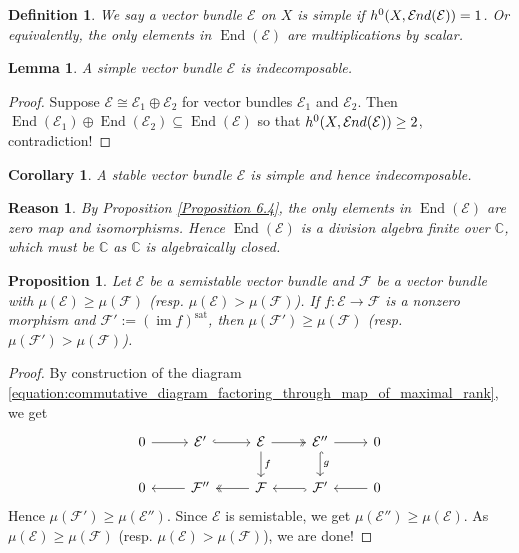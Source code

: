 \documentclass{ctexart}
\newtheorem{definition}{Definition}[section]
\newtheorem{proposition}{Proposition}[section]
\newtheorem{lemma}{Lemma}[section]
\newtheorem{reason}{Reason}[section]
\newtheorem{corollary}{Corollary}[section]
\newcommand{\im}{\operatorname{im}}
\newcommand{\homend}{\operatorname{End}}
\newcommand{\sheafend}{\mathcal{E}\kern -.5pt nd}
\newcommand{\saturation}{\operatorname{sat}}
\begin{document}
\begin{definition}
    We say a vector bundle $\mathcal{E}$ on $X$ is simple if $h^{0}(X, \sheafend(\mathcal{E})) = 1$.
    Or equivalently, the only elements in $\homend(\mathcal{E})$ are multiplications by scalar.
\end{definition}
\begin{lemma}
    A simple vector bundle $\mathcal{E}$ is indecomposable.
    \label{Lemma 6.4}
\end{lemma}
\begin{proof}
    Suppose $\mathcal{E} \cong \mathcal{E}_{1} \oplus \mathcal{E}_{2}$ for vector bundles $\mathcal{E}_{1}$ and $\mathcal{E}_{2}$.
    Then $\homend(\mathcal{E}_{1}) \oplus \homend(\mathcal{E}_{2}) \subseteq \homend(\mathcal{E})$ so that $h^{0}(X, \sheafend(\mathcal{E})) \ge 2$, contradiction!
\end{proof}
\begin{corollary}
    A stable vector bundle $\mathcal{E}$ is simple and hence indecomposable.
    \label{Corollary 6.1}
\end{corollary}
\begin{reason}
    By Proposition \ref{Proposition 6.4}, the only elements in $\homend(\mathcal{E})$ are zero map and isomorphisms.
    Hence $\homend(\mathcal{E})$ is a division algebra finite over $\mathbb{C}$, which must be $\mathbb{C}$ as $\mathbb{C}$ is algebraically closed.
\end{reason}
\begin{proposition}
    Let $\mathcal{E}$ be a semistable vector bundle and $\mathcal{F}$ be a vector bundle with $\mu(\mathcal{E}) \ge \mu(\mathcal{F})$ (resp. $\mu(\mathcal{E}) > \mu(\mathcal{F})$).
    If $f: \mathcal{E} \rightarrow \mathcal{F}$ is a nonzero morphism and $\mathcal{F}' := (\im f)^{\saturation}$, then $\mu(\mathcal{F}') \ge \mu(\mathcal{F})$ (resp. $\mu(\mathcal{F}') > \mu(\mathcal{F})$).
    \label{Proposition 6.5}
\end{proposition}
\begin{proof}
    By construction of the diagram \ref{equation:commutative_diagram_factoring_through_map_of_maximal_rank}, we get
    \begin{equation}
        \begin{tikzcd}
            0 \arrow[r] &
            \mathcal{E}' \arrow[r, hookrightarrow] &
            \mathcal{E} \arrow[r, twoheadrightarrow] \arrow[d, "f"] &
            \mathcal{E}'' \arrow[r] \arrow[d, hookrightarrow, "g"] &
            0 \\
            0 &
            \mathcal{F}'' \arrow[l] &
            \mathcal{F} \arrow[l, twoheadrightarrow] &
            \mathcal{F}' \arrow[l, hookrightarrow] &
            0 \arrow[l] 
        \end{tikzcd}
    \end{equation}
    Hence $\mu(\mathcal{F}') \ge \mu(\mathcal{E}'')$.
    Since $\mathcal{E}$ is semistable, we get $\mu(\mathcal{E}'') \ge \mu(\mathcal{E})$.
    As $\mu(\mathcal{E}) \ge \mu(\mathcal{F})$ (resp. $\mu(\mathcal{E}) > \mu(\mathcal{F})$), we are done!
\end{proof}
\end{document}
